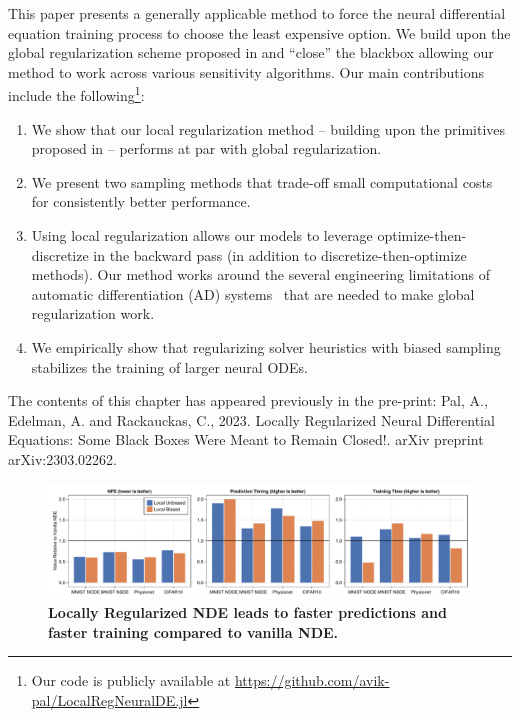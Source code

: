 This paper presents a generally applicable method to force the neural differential equation training process to choose the least expensive option. We build upon the global regularization scheme proposed in \citet{pal2021opening} and ``close'' the blackbox allowing our method to work across various sensitivity algorithms. Our main contributions include the following\footnote{Our code is publicly available at \url{https://github.com/avik-pal/LocalRegNeuralDE.jl}}:
%
\begin{enumerate}
  \item We show that our local regularization method -- building upon the primitives proposed in \citet{pal2021opening} -- performs at par with global regularization.

  \item We present two sampling methods that trade-off small computational costs for consistently better performance.

  \item Using local regularization allows our models to leverage optimize-then-discretize in the backward pass (in addition to discretize-then-optimize methods). Our method works around the several engineering limitations of automatic differentiation (AD) systems~\citep{rackauckas_2022} that are needed to make global regularization work.

  \item We empirically show that regularizing solver heuristics with biased sampling stabilizes the training of larger neural ODEs.
\end{enumerate}
%

The contents of this chapter has appeared previously in the pre-print: Pal, A., Edelman, A. and Rackauckas, C., 2023. Locally Regularized Neural Differential Equations: Some Black Boxes Were Meant to Remain Closed!. arXiv preprint arXiv:2303.02262. \citep{pal2023locally}

\begin{figure}[t]
  \centering
  \includegraphics[width=\textwidth]{../figures/local_regularizing_neural_des/summary_plot.pdf}
  \caption{\textbf{Locally Regularized NDE leads to faster predictions and faster training compared to vanilla NDE.}}
  \label{fig:localreg_summary_plot}
\end{figure}


